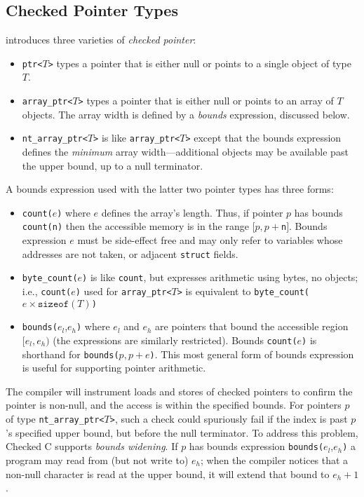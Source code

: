\documentclass[conference]{IEEEtran}
\newcommand{\code}[1]{\lstinline|#1|}
\newcommand{\checkedc}{\text{Checked C}\xspace}
\begin{document}
\subsection{Checked Pointer Types}
\checkedc introduces three varieties of \emph{checked pointer}:
\begin{itemize}
\item \code{ptr<}$T$\code{>} types a pointer that is either null or
  points to a single object of type $T$.
\item \code{array_ptr<}$T$\code{>} types a pointer that is either null
  or points to an array of $T$ objects. The array width is defined
  by a \emph{bounds} expression, discussed below.
\item \code{nt_array_ptr<}$T$\code{>} is like
  \code{array_ptr<}$T$\code{>} except that the bounds expression
  defines the \emph{minimum} array width---additional objects may
  be available past the upper bound, up to a null terminator.
\end{itemize}
A bounds expression used with the latter two pointer types has three
forms:
\begin{itemize}
\item \code{count(}$e$\code{)} where $e$ defines the array's
  length. Thus, if pointer $p$ has bounds \code{count(n)} then the
  accessible memory is in the range $[p,p+$\code{n}$]$. Bounds
  expression $e$ must be side-effect free and may only refer to
  variables whose addresses are not taken, or adjacent \code{struct}
  fields.
\item \code{byte_count(}$e$\code{)} is like \code{count}, but
  expresses arithmetic using bytes, no objects; i.e.,
  \code{count(}$e$\code{)} used for \code{array_ptr<}$T$\code{>} is
  equivalent to \code{byte_count(}$e\times\texttt{sizeof}(T)$\code{)}
\item \code{bounds(}$e_l$,$e_h$\code{)} where $e_l$ and $e_h$ are
  pointers that bound the accessible region $[e_l,e_h)$ (the
  expressions are similarly restricted). Bounds
  \code{count(}$e$\code{)} is shorthand for
  \code{bounds(}$p, p + e$\code{)}. This most general form of bounds
  expression is useful for supporting pointer arithmetic.
\end{itemize}
The \checkedc compiler will instrument loads and stores of checked
pointers to confirm the pointer is non-null, and the access is within
the specified bounds. For pointers $p$ of type
\code{nt_array_ptr<}$T$\code{>}, such a check could spuriously fail if
the index is past $p$'s specified upper bound, but before the null
terminator. To address this problem, Checked C supports \emph{bounds
  widening}. If $p$ has bounds expression
\code{bounds(}$e_l$,$e_h$\code{)} a program may read from (but not
write to) $e_h$; when the compiler notices that a non-null character
is read at the upper bound, it will extend that bound to $e_h+1$.
\end{document}
